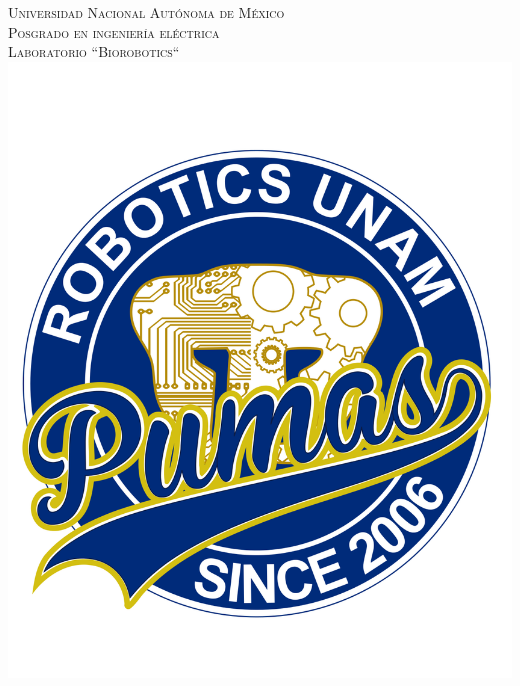 \documentclass[user_manual.tex]{subfiles}
\begin{document}
 
\begin{titlepage}

\newcommand{\HRule}{\rule{\linewidth}{0.5mm}} 
\begin{center}


\textsc{\LARGE Universidad Nacional Autónoma de México}\\[1cm] 
\textsc{\Large Posgrado en ingeniería eléctrica}\\[0.5cm] 
\textsc{\large Laboratorio ``Biorobotics``}\\[1cm] 

\includegraphics[scale=0.3]{mangas_blanca_pin}\\[1cm]


\end{center}
\end{titlepage}
\end{document}
